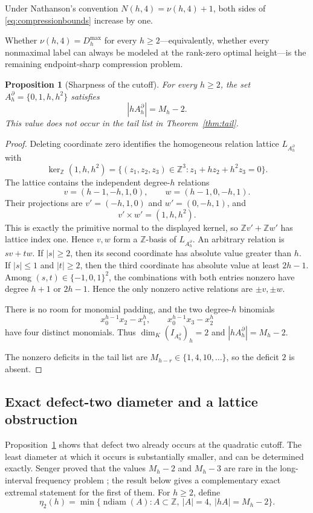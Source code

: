 \documentclass[11pt,reqno]{amsart}
\newtheorem{proposition}[theorem]{Proposition}
\theoremstyle{definition}
\theoremstyle{remark}
\newcommand{\Z}{\mathbb Z}
\newcommand{\ndiam}{\operatorname{ndiam}}
\begin{document}
Under Nathanson's convention $N(h,4)=\nu(h,4)+1$, both sides of
\eqref{eq:compressionbounds} increase by one.

Whether $\nu(h,4)=D_h^{\max}$ for every $h\geq2$---equivalently, whether
every nonmaximal label can always be modeled at the rank-zero optimal
height---is the remaining endpoint-sharp compression problem.

\begin{proposition}[Sharpness of the cutoff]\label{prop:boundary}
For every $h\geq2$, the set $A_h^\partial=\{0,1,h,h^2\}$ satisfies
\[
 |hA_h^\partial|=M_h-2.
\]
This value does not occur in the tail list in Theorem~\ref{thm:tail}.
\end{proposition}

\begin{proof}
Deleting coordinate zero identifies the homogeneous relation lattice
$L_{A_h^\partial}$ with
\[
 \ker_{\mathbb Z}(1,h,h^2)
 =\{(z_1,z_2,z_3)\in\mathbb Z^3:
       z_1+hz_2+h^2z_3=0\}.
\]
The lattice contains the independent degree-$h$ relations
\[
 v=(h-1,-h,1,0),\qquad w=(h-1,0,-h,1).
\]
Their projections are $v'=(-h,1,0)$ and $w'=(0,-h,1)$, and
\[
 v'\times w'=(1,h,h^2).
\]
This is exactly the primitive normal to the displayed kernel, so
$\mathbb Zv'+\mathbb Zw'$ has lattice index one.  Hence $v,w$ form a
$\mathbb Z$-basis of $L_{A_h^\partial}$.  An arbitrary relation is
$sv+tw$.  If
$|s|\geq2$, then its second coordinate has absolute value greater than
$h$.  If $|s|\leq1$ and $|t|\geq2$, then the third coordinate has absolute
value at least $2h-1$.  Among $(s,t)\in\{-1,0,1\}^2$, the combinations
with both entries nonzero have degree $h+1$ or $2h-1$.  Hence the only
nonzero active relations are $\pm v,\pm w$.

There is no room for monomial padding, and the two degree-$h$ binomials
\[
 x_0^{h-1}x_2-x_1^h,
 \qquad
 x_0^{h-1}x_3-x_2^h
\]
have four distinct monomials.  Thus $\dim_K(I_{A_h^\partial})_h=2$ and
$|hA_h^\partial|=M_h-2$.

The nonzero deficits in the tail list are
$M_{h-r}\in\{1,4,10,\ldots\}$, so the deficit $2$ is absent.
\end{proof}

\subsection{Exact defect-two diameter and a lattice obstruction}
\label{subsec:defect-two-diameter}

Proposition~\ref{prop:boundary} shows that defect two already occurs at the
quadratic cutoff.  The least diameter at which it occurs is substantially
smaller, and can be determined exactly.  Senger proved that the values
$M_h-2$ and $M_h-3$ are rare in the long-interval frequency problem
\cite[Theorem~2]{Senger2025}; the result below gives a complementary exact
extremal statement for the first of them.  For $h\geq2$, define
\[
 \eta_2(h)=\min\{\ndiam(A):A\subset\Z,\ |A|=4,
                    \ |hA|=M_h-2\}.
\]
\end{document}
